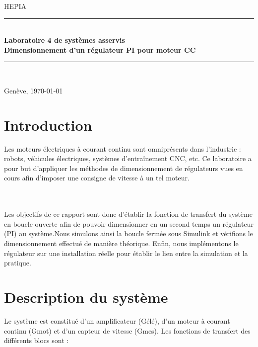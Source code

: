 \documentclass[12pt,a4paper]{article}
\begin{document}
\begin{titlepage}
  \centering
  \vspace*{2cm}
  {\scshape\Large HEPIA \par}
  \vspace{2cm}
  \rule{\linewidth}{0.5pt}\\[0.4cm]
      {\huge\bfseries Laboratoire 4 de systèmes asservis\\}
  \vspace{1cm}
        {\Large\bfseries Dimensionnement d'un régulateur PI pour moteur CC}
  \rule{\linewidth}{0.5pt}\\[1.5cm]
  \vfill
  {\large Genève, \today\par}
\end{titlepage}

\tableofcontents
\newpage

\section{Introduction}

Les moteurs électriques à courant continu sont omniprésents dans l'industrie : robots, véhicules
électriques, systèmes d'entraînement CNC, etc. Ce laboratoire a pour but d'appliquer les méthodes de
dimensionnement de régulateurs vues en cours afin d'imposer une consigne de vitesse à un tel moteur.

\\\\
Les objectifs de ce rapport sont donc d'établir la fonction de transfert du système en boucle ouverte afin de pouvoir dimensionner en un second temps un régulateur (PI) au système.Nous simulons ainsi la boucle fermée sous Simulink et vérifions le dimensionnement effectué de manière théorique. Enfin, nous implémentons le régulateur sur une installation réelle pour établir le lien entre la simulation et la pratique.

\section{Description du système}

Le système est constitué d'un amplificateur (Gélé), d'un moteur à courant continu (Gmot) et d'un capteur de vitesse (Gmes). Les fonctions de transfert des différents blocs sont :
\end{document}
